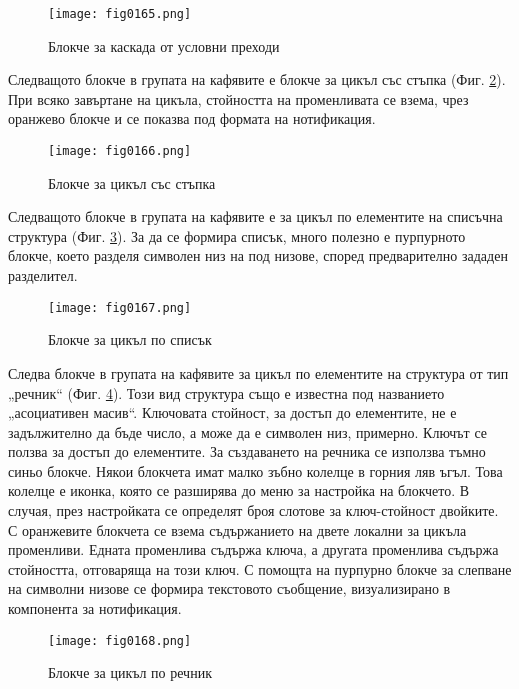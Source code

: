 \begin{figure}[H]
  \centering
  \texttt{[image: fig0165.png]}
  \caption{Блокче за каскада от условни преходи}
\label{fig0165}
\end{figure}

Следващото блокче в групата на кафявите е блокче за цикъл със стъпка (Фиг. \ref{fig0166}). При всяко завъртане на цикъла, стойността на променливата се взема, чрез оранжево блокче и се показва под формата на нотификация. 

\begin{figure}[H]
  \centering
  \texttt{[image: fig0166.png]}
  \caption{Блокче за цикъл със стъпка}
\label{fig0166}
\end{figure}

Следващото блокче в групата на кафявите е за цикъл по елементите на списъчна структура (Фиг. \ref{fig0167}). За да се формира списък, много полезно е пурпурното блокче, което разделя символен низ на под низове, според предварително зададен разделител. 

\begin{figure}[H]
  \centering
  \texttt{[image: fig0167.png]}
  \caption{Блокче за цикъл по списък}
\label{fig0167}
\end{figure}

Следва блокче в групата на кафявите за цикъл по елементите на структура от тип „речник“ (Фиг. \ref{fig0168}). Този вид структура също е известна под названието „асоциативен масив“. Ключовата стойност, за достъп до елементите, не е задължително да бъде число, а може да е символен низ, примерно. Ключът се ползва за достъп до елементите. За създаването на речника се използва тъмно синьо блокче. Някои блокчета имат малко зъбно колелце в горния ляв ъгъл. Това колелце е иконка, която се разширява до меню за настройка на блокчето. В случая, през настройката се определят броя слотове за ключ-стойност двойките. С оранжевите блокчета се взема съдържанието на двете локални за цикъла променливи. Едната променлива съдържа ключа, а другата променлива съдържа стойността, отговаряща на този ключ. С помощта на пурпурно блокче за слепване на символни низове се формира текстовото съобщение, визуализирано в компонента за нотификация. 

\begin{figure}[H]
  \centering
  \texttt{[image: fig0168.png]}
  \caption{Блокче за цикъл по речник}
\label{fig0168}
\end{figure}

